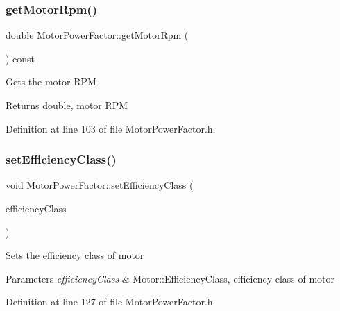 \subsubsection{\texorpdfstring{get\+Motor\+Rpm()}{getMotorRpm()}}
{\footnotesize\ttfamily double Motor\+Power\+Factor\+::get\+Motor\+Rpm (\begin{DoxyParamCaption}{ }\end{DoxyParamCaption}) const\hspace{0.3cm}{\ttfamily [inline]}}

Gets the motor R\+PM \begin{DoxyReturn}{Returns}
double, motor R\+PM 
\end{DoxyReturn}


Definition at line 103 of file Motor\+Power\+Factor.\+h.

\mbox{\label{class_motor_power_factor_add3125243d7f11131abc4e1d172ffdfc}} 
\subsubsection{\texorpdfstring{set\+Efficiency\+Class()}{setEfficiencyClass()}}
{\footnotesize\ttfamily void Motor\+Power\+Factor\+::set\+Efficiency\+Class (\begin{DoxyParamCaption}\item[{Motor\+::\+Efficiency\+Class}]{efficiency\+Class }\end{DoxyParamCaption})\hspace{0.3cm}{\ttfamily [inline]}}

Sets the efficiency class of motor 
\begin{DoxyParams}{Parameters}
{\em efficiency\+Class} & Motor\+::\+Efficiency\+Class, efficiency class of motor \\
\hline
\end{DoxyParams}


Definition at line 127 of file Motor\+Power\+Factor.\+h.

\mbox{\label{class_motor_power_factor_a5186ccae4191cfc5b2b7c3bdbd166563}} 

